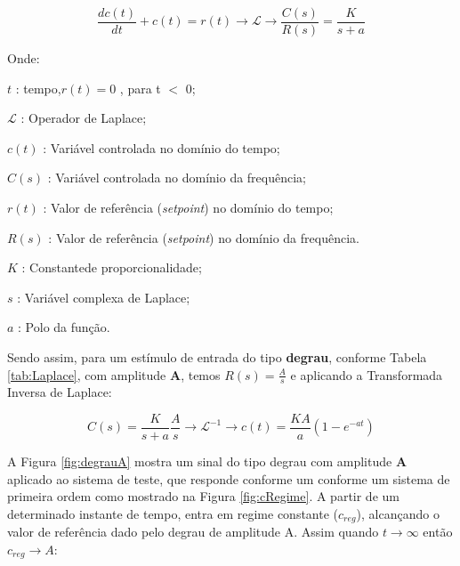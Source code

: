 \begin{equation}
	 \frac{d c(t)}{dt} + c(t) = r(t) \rightarrow  \mathscr{L} \to \frac{C(s)}{R(s)} = \frac{K}{s + a} 
\label{eq:ftSistOrdem1}
\end{equation}


Onde:

\setlength{\parindent}{2cm}

$t$ : tempo,$ r(t) = 0$ , para t $<$ 0;

$\mathscr{L}$ : Operador de Laplace;

$c(t)$ : Variável controlada no domínio do tempo;

$C(s)$ : Variável controlada no domínio da frequência;

$r(t)$ : Valor de referência (\emph{setpoint}) no domínio do tempo;

$R(s)$ : Valor de referência (\emph{setpoint}) no domínio da frequência.

$K$ : Constantede proporcionalidade;

$s$ : Variável complexa de Laplace;

$a$ : Polo da função.
\setlength{\parindent}{1cm}

Sendo assim, para um estímulo de entrada do tipo \textbf{degrau}, conforme Tabela \ref{tab:Laplace}, com amplitude \textbf{A}, temos $ R(s) = \frac{A}{s}$ e aplicando a Transformada Inversa de Laplace:

\begin{equation}
C(s) = \frac{K}{s+a} \frac{A}{s} \rightarrow \mathscr{L}^{-1} \to c(t) = \frac{K A}{a} (1 - e^{-at})
\label{eq:degrauA}
\end{equation}

A Figura \ref{fig:degrauA} mostra um sinal do tipo degrau com amplitude \textbf{A} aplicado ao sistema de teste, que responde conforme um conforme um sistema de primeira ordem como mostrado na Figura \ref{fig:cRegime}. A partir de um determinado instante de tempo, entra em regime constante ($c_{reg}$), alcançando o valor de referência dado pelo degrau de amplitude A. Assim quando $ t \rightarrow \infty $  então $ c_{reg} \rightarrow A $:


